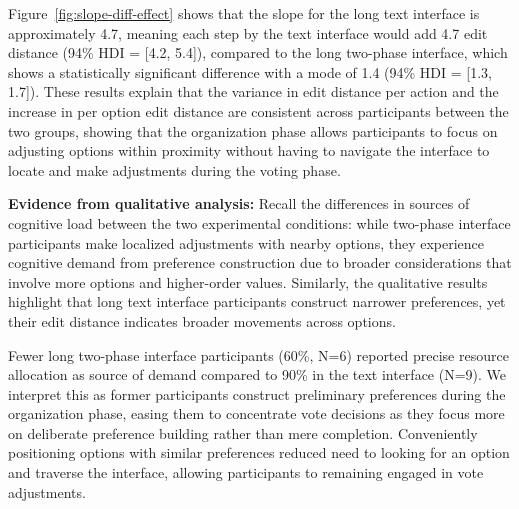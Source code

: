 Figure~\ref{fig:slope-diff-effect} shows that the slope for the long text interface is approximately 4.7, meaning each step by the text interface would add 4.7 edit distance (94\% HDI = [4.2, 5.4]), compared to the long two-phase interface, which shows a statistically significant difference with a mode of 1.4 (94\% HDI = [1.3, 1.7]). These results explain that the variance in edit distance per action and the increase in per option edit distance are consistent across participants between the two groups, showing that the organization phase allows participants to focus on adjusting options within proximity without having to navigate the interface to locate and make adjustments during the voting phase.

\textbf{Evidence from qualitative analysis:} Recall the differences in sources of cognitive load between the two experimental conditions: while two-phase interface participants make localized adjustments with nearby options, they experience cognitive demand from preference construction due to broader considerations that involve more options and higher-order values. Similarly, the qualitative results highlight that long text interface participants construct narrower preferences, yet their edit distance indicates broader movements across options.

Fewer long two-phase interface participants (60\%, N=6) reported precise resource allocation as source of demand compared to 90\% in the text interface (N=9). We interpret this as former participants construct preliminary preferences during the organization phase, easing them to concentrate vote decisions as they focus more on deliberate preference building rather than mere completion. Conveniently positioning options with similar preferences reduced need to looking for an option and traverse the interface, allowing participants to remaining engaged in vote adjustments.
